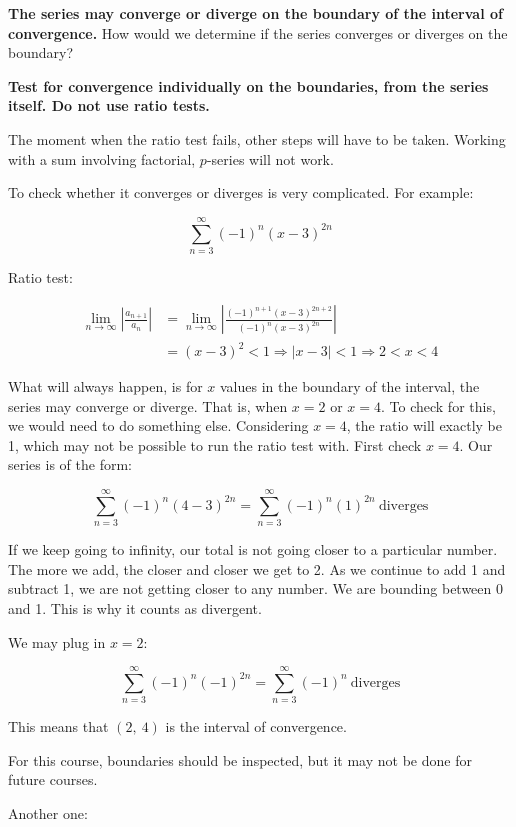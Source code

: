 \documentclass[12pt]{article}
\theoremstyle{plain}
\theoremstyle{remark}
\theoremstyle{definition}
\begin{document}
\textbf{The series may converge or diverge on the boundary of the
interval of convergence.} How would we determine if the series converges
or diverges on the boundary?

\textbf{Test for convergence individually on the boundaries, from the
series itself. Do not use ratio tests.}

The moment when the ratio test fails, other steps will have to be taken.
Working with a sum involving factorial, \(p\)-series will not work.

To check whether it converges or diverges is very complicated. For
example:

\[\sum_{n = 3}^{\infty}{( - 1)^{n}(x - 3)^{2n}}\]

Ratio test:

\begin{align*}
\lim_{n \rightarrow \infty}\left| \frac{a_{n + 1}}{a_{n}} \right| &= \lim_{n \rightarrow \infty}\left| \frac{( - 1)^{n + 1}(x - 3)^{2n + 2}}{( - 1)^{n}(x - 3)^{2n}} \right| \\
&= (x - 3)^{2} < 1 \Rightarrow |x - 3| < 1 \Rightarrow 2 < x < 4
\end{align*}


What will always happen, is for \(x\) values in the boundary of the
interval, the series may converge or diverge. That is, when \(x = 2\) or
\(x = 4\). To check for this, we would need to do something else.
Considering \(x = 4\), the ratio will exactly be 1, which may not be
possible to run the ratio test with. First check \(x = 4\). Our series
is of the form:

\[\sum_{n = 3}^{\infty}{( - 1)^{n}(4 - 3)^{2n}} = \sum_{n = 3}^{\infty}{( - 1)^{n}(1)^{2n}}\ \text{diverges}\]

If we keep going to infinity, our total is not going closer to a
particular number. The more we add, the closer and closer we get to 2.
As we continue to add 1 and subtract 1, we are not getting closer to any
number. We are bounding between 0 and 1. This is why it counts as
divergent.

We may plug in \(x = 2\):

\[\sum_{n = 3}^{\infty}{( - 1)^{n}( - 1)^{2n}} = \sum_{n = 3}^{\infty}( - 1)^{n}\ \text{diverges}\]

This means that \((2,\ 4)\) is the interval of convergence.

For this course, boundaries should be inspected, but it may not be done
for future courses.

Another one:
\end{document}
